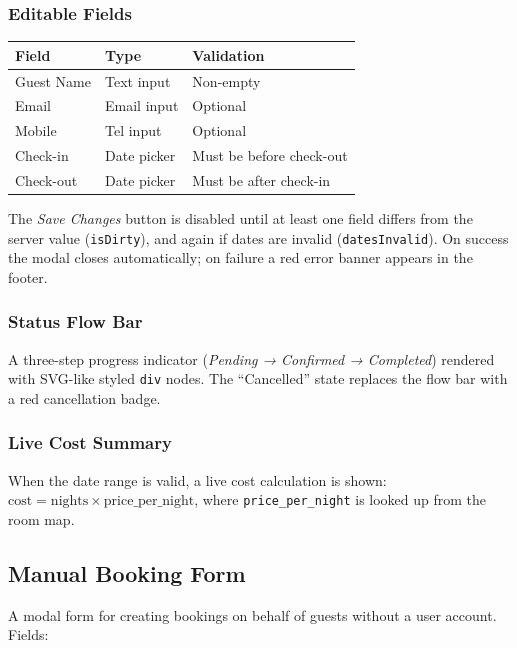 \documentclass[12pt,a4paper]{report}
\begin{document}
\subsubsection{Editable Fields}

\begin{center}
\begin{tabular}{lll}
  \toprule
  \textbf{Field} & \textbf{Type} & \textbf{Validation} \\
  \midrule
  Guest Name   & Text input  & Non-empty \\
  Email        & Email input & Optional \\
  Mobile       & Tel input   & Optional \\
  Check-in     & Date picker & Must be before check-out \\
  Check-out    & Date picker & Must be after check-in \\
  \bottomrule
\end{tabular}
\end{center}

The \emph{Save Changes} button is disabled until at least one field differs from
the server value (\texttt{isDirty}), and again if dates are invalid
(\texttt{datesInvalid}). On success the modal closes automatically; on failure
a red error banner appears in the footer.

\subsubsection{Status Flow Bar}

A three-step progress indicator (\emph{Pending → Confirmed → Completed}) rendered
with SVG-like styled \texttt{div} nodes. The ``Cancelled'' state replaces the flow
bar with a red cancellation badge.

\subsubsection{Live Cost Summary}

When the date range is valid, a live cost calculation is shown:
$\text{cost} = \text{nights} \times \text{price\_per\_night}$,
where \texttt{price\_per\_night} is looked up from the room map.

\subsection{Manual Booking Form}

A modal form for creating bookings on behalf of guests without a user account.
Fields:
\end{document}

